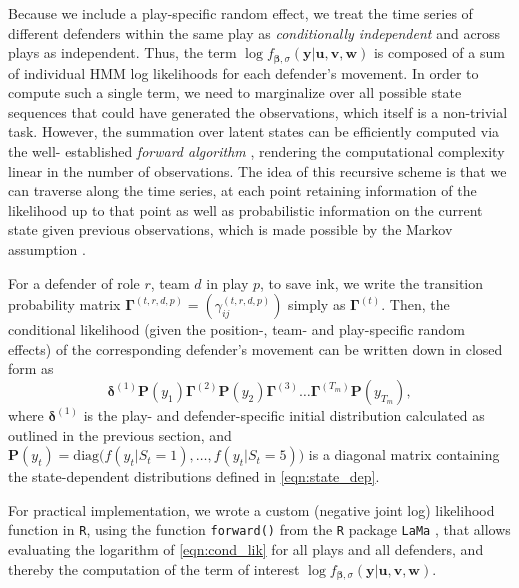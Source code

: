 \documentclass[namedate,webpdf,modern,medium]{oup-authoring-template}
\begin{document}
Because we include a play-specific random effect, we treat the time series of different defenders within the same play as \emph{conditionally independent} and across plays as independent. Thus, the term $\log f_{\bm{\beta}, \sigma}(\bm{y} \vert \bm{u}, \bm{v}, \bm{w})$ %
is composed of a sum of individual HMM log likelihoods for each defender's movement. %
In order to compute such a single term, we need to marginalize over all possible state sequences that could have generated the observations, which itself is a non-trivial task. However, the summation over latent states can be efficiently computed via the well- established \textit{forward algorithm} \citep{zucchini, mews2025build}, rendering the computational complexity linear in the number of observations. The idea of this recursive scheme is that we can traverse along the time series, at each point retaining information of the likelihood up to that point as well as probabilistic information on the current state given previous observations, which is made possible by the Markov assumption \citep{lystig2002exact}.

For a defender %
of role $r$, team $d$ in play $p$, to save ink, we write the transition probability matrix $\bm{\Gamma}^{(t,r,d,p)} = (\gamma_{ij}^{(t,r,d,p)})$ simply as $\bm{\Gamma}^{(t)}$. 
Then, the conditional likelihood (given the position-, team- and play-specific random effects) of the corresponding defender's movement can be written down in closed form as
\begin{equation}
    \label{eqn:cond_lik}
    \bm{\delta}^{(1)} \bm{P}(y_1) \bm{\Gamma}^{(2)} \bm{P}(y_2) \bm{\Gamma}^{(3)} \dotsc \bm{\Gamma}^{(T_m)} \bm{P}(y_{T_m}),
\end{equation}
where $\bm{\delta}^{(1)}$ is the play- and defender-specific initial distribution calculated as outlined in the previous section, and $\bm{P}(y_t) = \text{diag}\bigl(f(y_t \vert S_t = 1), \dotsc, f(y_t \vert S_t = 5)\bigr)$ is a diagonal matrix containing the state-dependent distributions defined in \eqref{eqn:state_dep}.

For practical implementation, we wrote a custom (negative joint log) likelihood function in \texttt{R}, using the function \texttt{forward()} 
from the \texttt{R} package \texttt{LaMa} \citep{koslikLaMa2025}, that allows evaluating the logarithm of \eqref{eqn:cond_lik} for all plays and all defenders, and thereby the computation of the term of interest $\log f_{\bm{\beta}, \sigma}(\bm{y} \vert \bm{u}, \bm{v}, \bm{w})$.
\end{document}
